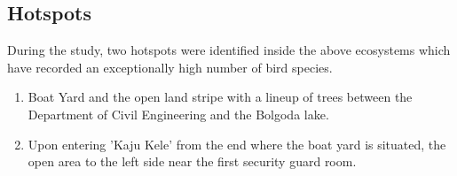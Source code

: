 \subsection{Hotspots}
During the study, two hotspots were identified inside the above ecosystems which have recorded an exceptionally high number of bird species.
\begin{enumerate}
    \item  Boat Yard and the open land stripe with a lineup of trees between the Department of Civil Engineering and the Bolgoda lake.
    \item Upon entering 'Kaju Kele' from the end where the boat yard is situated, the open area to the left side near the first security guard room.
\end{enumerate}